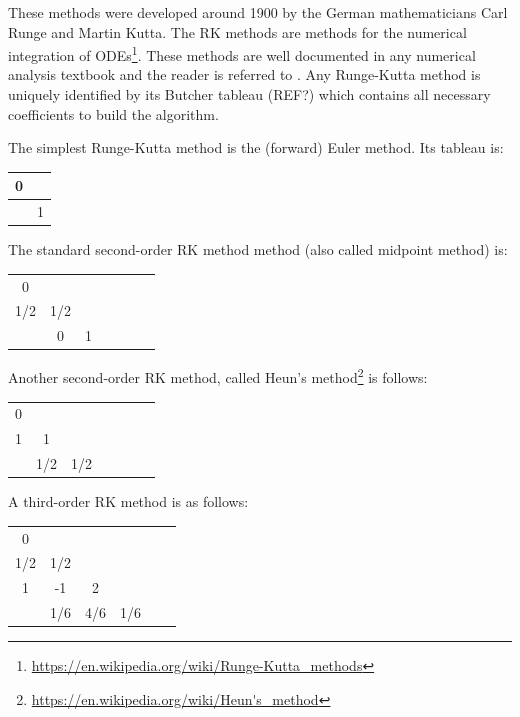 These methods were developed around 1900 by the German mathematicians Carl Runge and Martin Kutta.
The RK methods are methods for the numerical integration of 
ODEs\footnote{\url{https://en.wikipedia.org/wiki/Runge-Kutta_methods}}. These methods are well 
documented in any numerical analysis textbook and the reader is referred to \cite{gery10,tack10}.
Any Runge-Kutta method is uniquely identified by its Butcher tableau (REF?) which contains 
all necessary coefficients to build the algorithm.

The simplest Runge-Kutta method is the (forward) Euler method. Its tableau is:

\begin{mdframed}[backgroundcolor=blue!5]
\begin{tabular}{c|c}
0 & \\
\hline
 & 1
\end{tabular}
\end{mdframed}

 
The standard second-order RK method method (also called midpoint method) is:

\begin{mdframed}[backgroundcolor=blue!5]
\begin{tabular}{c|cccccc}
0 & \\
1/2 & 1/2 \\
\hline
 & 0 & 1 
\end{tabular}
\end{mdframed}

Another second-order RK method, called Heun's 
method\footnote{\url{https://en.wikipedia.org/wiki/Heun's_method}} is follows:

\begin{mdframed}[backgroundcolor=blue!5]
\begin{tabular}{c|cccccc}
0 & \\
1 & 1 \\
\hline
 & 1/2 & 1/2 
\end{tabular}
\end{mdframed}

A third-order RK method is as follows:

\begin{mdframed}[backgroundcolor=blue!5]
\begin{tabular}{c|ccccc}
0 & \\
1/2 & 1/2 \\
1 & -1 & 2 \\ 
\hline
 & 1/6 & 4/6  & 1/6
\end{tabular}
\end{mdframed}


